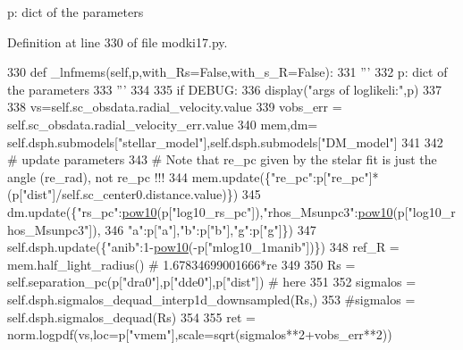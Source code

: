 \begin{DoxyVerb}p: dict of the parameters
\end{DoxyVerb}
 

Definition at line 330 of file modki17.\+py.


\begin{DoxyCode}
330     \textcolor{keyword}{def }\_lnfmems(self,p,with\_Rs=False,with\_s\_R=False):
331         \textcolor{stringliteral}{'''}
332 \textcolor{stringliteral}{        p: dict of the parameters}
333 \textcolor{stringliteral}{        '''}
334 
335         \textcolor{keywordflow}{if} DEBUG:
336             display(\textcolor{stringliteral}{"args of loglikeli:"},p)
337         
338         vs=self.sc\_obsdata.radial\_velocity.value
339         vobs\_err = self.sc\_obsdata.radial\_velocity\_err.value
340         mem,dm= self.dsph.submodels[\textcolor{stringliteral}{"stellar\_model"}],self.dsph.submodels[\textcolor{stringliteral}{"DM\_model"}]
341         
342         \textcolor{comment}{# update parameters}
343         \textcolor{comment}{# Note that re\_pc given by the stelar fit is just the angle (re\_rad), not re\_pc !!!}
344         mem.update(\{\textcolor{stringliteral}{"re\_pc"}:p[\textcolor{stringliteral}{"re\_pc"}]*(p[\textcolor{stringliteral}{"dist"}]/self.sc\_center0.distance.value)\}) 
345         dm.update(\{\textcolor{stringliteral}{"rs\_pc"}:\hyperlink{namespacemodki17_ada83ead5e6085ed227b1e64d233eea03}{pow10}(p[\textcolor{stringliteral}{"log10\_rs\_pc"}]),\textcolor{stringliteral}{"rhos\_Msunpc3"}:\hyperlink{namespacemodki17_ada83ead5e6085ed227b1e64d233eea03}{pow10}(p[\textcolor{stringliteral}{"log10\_rhos\_Msunpc3"}]),
346                    \textcolor{stringliteral}{"a"}:p[\textcolor{stringliteral}{"a"}],\textcolor{stringliteral}{"b"}:p[\textcolor{stringliteral}{"b"}],\textcolor{stringliteral}{"g"}:p[\textcolor{stringliteral}{"g"}]\})
347         self.dsph.update(\{\textcolor{stringliteral}{"anib"}:1-\hyperlink{namespacemodki17_ada83ead5e6085ed227b1e64d233eea03}{pow10}(-p[\textcolor{stringliteral}{"mlog10\_1manib"}])\})
348         ref\_R = mem.half\_light\_radius() \textcolor{comment}{# 1.67834699001666*re}
349         
350         Rs = self.separation\_pc(p[\textcolor{stringliteral}{"dra0"}],p[\textcolor{stringliteral}{"dde0"}],p[\textcolor{stringliteral}{"dist"}]) \textcolor{comment}{# here }
351         
352         sigmalos = self.dsph.sigmalos\_dequad\_interp1d\_downsampled(Rs,)
353         \textcolor{comment}{#sigmalos = self.dsph.sigmalos\_dequad(Rs)}
354         
355         ret = norm.logpdf(vs,loc=p[\textcolor{stringliteral}{"vmem"}],scale=sqrt(sigmalos**2+vobs\_err**2))

\end{DoxyCode}
